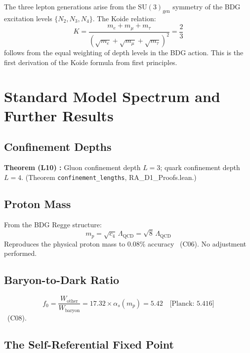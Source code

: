 \documentclass[12pt,a4paper]{article}
\begin{document}
The three lepton generations arise from the $\mathrm{SU}(3)_{\text{gen}}$ symmetry of the BDG excitation levels $\{N_2,N_3,N_4\}$.  The Koide relation:
\begin{equation}
  K = \frac{m_e + m_\mu + m_\tau}{(\sqrt{m_e}+\sqrt{m_\mu}+\sqrt{m_\tau})^2} = \frac{2}{3}
\end{equation}
follows from the equal weighting of depth levels in the BDG action.  This is the first derivation of the Koide formula from first principles.

\section{Standard Model Spectrum and Further Results}\label{sec:spectrum}

\subsection{Confinement Depths}

\begin{leanbox}
\textbf{Theorem (L10) \statusLV:} Gluon confinement depth $L=3$; quark confinement depth $L=4$.  (Theorem \texttt{confinement\_lengths}, RA\_D1\_Proofs.lean.)
\end{leanbox}

\subsection{Proton Mass}

From the BDG Regge structure:
\begin{equation}
  m_p = \sqrt{c_4}\,\Lambda_{\text{QCD}} = \sqrt{8}\,\Lambda_{\text{QCD}}
  \label{eq:proton}
\end{equation}
Reproduces the physical proton mass to $0.08\%$ accuracy \statusCV\ (C06).  No adjustment performed.

\subsection{Baryon-to-Dark Ratio}

\begin{equation}
  f_0 = \frac{W_{\text{other}}}{W_{\text{baryon}}} = 17.32 \times \alpha_s(m_p) = 5.42 \quad \text{[Planck: } 5.416\text{]}
  \label{eq:f0}
\end{equation}
\statusCV\ (C08).

\subsection{The Self-Referential Fixed Point}
\end{document}
